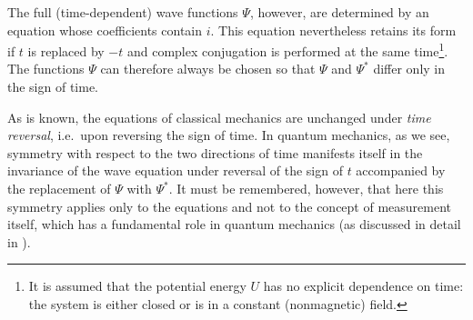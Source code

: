 The full (time-dependent) wave functions $\Psi$, however, are determined by an
equation whose coefficients contain $i$. This equation nevertheless retains
its form if $t$ is replaced by $-t$ and complex conjugation is performed at
the same time\footnote{It is assumed that the potential energy $U$ has no
explicit dependence on time: the system is either closed or is in a constant
(nonmagnetic) field.}. The functions $\Psi$ can therefore always be chosen so
that $\Psi$ and $\Psi^*$ differ only in the sign of time.

As is known, the equations of classical mechanics are unchanged under
\emph{time reversal}, i.e.\ upon reversing the sign of time. In quantum
mechanics, as we see, symmetry with respect to the two directions of time
manifests itself in the invariance of the wave equation under reversal of
the sign of $t$ accompanied by the replacement of $\Psi$ with $\Psi^*$. It must be
remembered, however, that here this symmetry applies only to the equations and
not to the concept of measurement itself, which has a fundamental role in
quantum mechanics (as discussed in detail in ).
